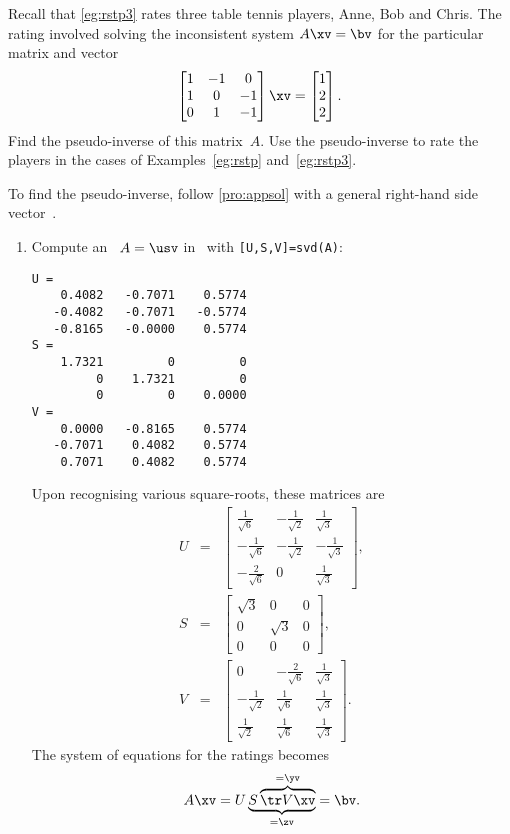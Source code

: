 \begin{example} \label{ex:} 
Recall that \autoref{eg:rstp3} rates three table tennis players, Anne, Bob and Chris.  
The rating involved solving the inconsistent system \(A\xv=\bv\) for the particular matrix and vector
\begin{equation*}
\begin{bmatrix} 1&-1&0\\1&0&-1\\0&1&-1 \end{bmatrix}\xv
=\begin{bmatrix} 1\\2\\2 \end{bmatrix}.
\end{equation*}
Find the pseudo-inverse of this matrix~\(A\).
Use the pseudo-inverse to rate the players in the cases of Examples~\ref{eg:rstp} and~\ref{eg:rstp3}.
\begin{solution} 
To find the pseudo-inverse, follow \autoref{pro:appsol} with a general right-hand side vector~\bv.
\begin{enumerate}
\item Compute an \svd\ \(A=\usv\) in \script\ with \verb|[U,S,V]=svd(A)|:
\begin{verbatim}
U =
    0.4082   -0.7071    0.5774
   -0.4082   -0.7071   -0.5774
   -0.8165   -0.0000    0.5774
S =
    1.7321         0         0
         0    1.7321         0
         0         0    0.0000
V =
    0.0000   -0.8165    0.5774
   -0.7071    0.4082    0.5774
    0.7071    0.4082    0.5774
\end{verbatim}
Upon recognising various square-roots, these matrices are
\begin{eqnarray*}
U&=&\begin{bmatrix} \frac1{\sqrt6}&-\frac1{\sqrt2}&\frac1{\sqrt3}
\\-\frac1{\sqrt6}&-\frac1{\sqrt2}&-\frac1{\sqrt3}
\\-\frac2{\sqrt6}&0&\frac1{\sqrt3} \end{bmatrix},
\\
S&=&\begin{bmatrix} \sqrt3&0&0
\\0&\sqrt3&0
\\0&0&0 \end{bmatrix},
\\
V&=&\begin{bmatrix} 0&-\frac2{\sqrt6}&\frac1{\sqrt3}
\\-\frac1{\sqrt2}&\frac1{\sqrt6}&\frac1{\sqrt3}
\\\frac1{\sqrt2}&\frac1{\sqrt6}&\frac1{\sqrt3} \end{bmatrix}.
\end{eqnarray*}
The system of equations for the ratings becomes
\begin{equation*}
A\xv=
U\underbrace{S\overbrace{\tr V\xv}^{=\yv}}_{=\zv}
=\bv.
\end{equation*}


\end{enumerate}
\end{solution}
\end{example}

